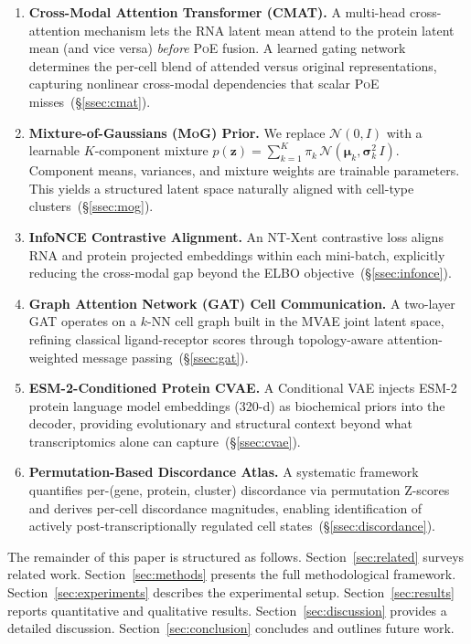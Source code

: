 \documentclass[11pt,a4paper]{article}
\newcommand{\cmat}{\textsc{CMAT}}
\newcommand{\mog}{\textsc{MoG}}
\newcommand{\gat}{\textsc{GAT}}
\newcommand{\poe}{\textsc{PoE}}
\newcommand{\bz}{\mathbf{z}}
\newcommand{\bmu}{\boldsymbol{\mu}}
\newcommand{\bsig}{\boldsymbol{\sigma}}
\begin{document}
\begin{enumerate}[leftmargin=*,label=\textbf{C\arabic*.}]
  \item \textbf{Cross-Modal Attention Transformer (\cmat).}
    A multi-head cross-attention mechanism lets the RNA latent mean attend to the protein latent mean (and vice versa) \emph{before} \poe{} fusion.
    A learned gating network determines the per-cell blend of attended versus original representations, capturing nonlinear cross-modal dependencies that scalar \poe{} misses~(\S\ref{ssec:cmat}).

  \item \textbf{Mixture-of-Gaussians (\mog) Prior.}
    We replace $\mathcal{N}(0,I)$ with a learnable $K$-component mixture $p(\bz)=\sum_{k=1}^{K}\pi_k\,\mathcal{N}(\bmu_k,\bsig_k^2\,I)$.
    Component means, variances, and mixture weights are trainable parameters.
    This yields a structured latent space naturally aligned with cell-type clusters~(\S\ref{ssec:mog}).

  \item \textbf{InfoNCE Contrastive Alignment.}
    An NT-Xent contrastive loss aligns RNA and protein projected embeddings within each mini-batch, explicitly reducing the cross-modal gap beyond the ELBO objective~(\S\ref{ssec:infonce}).

  \item \textbf{Graph Attention Network (\gat) Cell Communication.}
    A two-layer \gat{} operates on a $k$-NN cell graph built in the MVAE joint latent space, refining classical ligand-receptor scores through topology-aware attention-weighted message passing~(\S\ref{ssec:gat}).

  \item \textbf{ESM-2-Conditioned Protein CVAE.}
    A Conditional VAE injects ESM-2 protein language model embeddings (320-d) as biochemical priors into the decoder, providing evolutionary and structural context beyond what transcriptomics alone can capture~(\S\ref{ssec:cvae}).

  \item \textbf{Permutation-Based Discordance Atlas.}
    A systematic framework quantifies per-(gene, protein, cluster) discordance via permutation Z-scores and derives per-cell discordance magnitudes, enabling identification of actively post-transcriptionally regulated cell states~(\S\ref{ssec:discordance}).
\end{enumerate}

The remainder of this paper is structured as follows.
Section~\ref{sec:related} surveys related work.
Section~\ref{sec:methods} presents the full methodological framework.
Section~\ref{sec:experiments} describes the experimental setup.
Section~\ref{sec:results} reports quantitative and qualitative results.
Section~\ref{sec:discussion} provides a detailed discussion.
Section~\ref{sec:conclusion} concludes and outlines future work.
\end{document}
